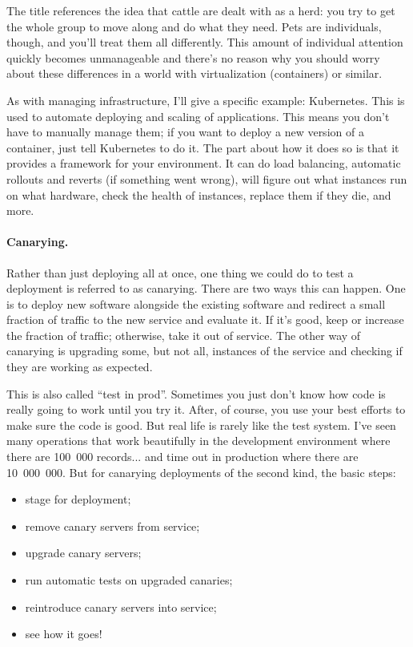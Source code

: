 \documentclass[a4paper]{report}
\begin{document}
The title references the idea that cattle are dealt with as a herd: you try to get the whole group to move along and do what they need. Pets are individuals, though, and you'll treat them all differently. This amount of individual attention quickly becomes unmanageable and there's no reason why you should worry about these differences in a world with virtualization (containers) or similar. 

As with managing infrastructure, I'll give a specific example: Kubernetes. This is used to automate deploying and scaling of applications. This means you don't have to manually manage them; if you want to deploy a new version of a container, just tell Kubernetes to do it. The part about how it does so is that it provides a framework for your environment. It can do load balancing, automatic rollouts and reverts (if something went wrong), will figure out what instances run on what hardware, check the health of instances, replace them if they die, and more.

\paragraph{Canarying.} Rather than just deploying all at once, one thing we could do to test a deployment is referred to as canarying. There are two ways this can happen. One is to deploy new software alongside the existing software and redirect a small fraction of traffic  to the new service and evaluate it. If it's good, keep or increase the fraction of traffic; otherwise, take it out of service. The other way of canarying is upgrading some, but not all, instances of the service and checking if they are working as expected.

This is also called ``test in prod''. Sometimes you just don't know how code is really going to work until you try it. After, of course, you use your best
efforts to make sure the code is good. But real life is rarely like the test system. I've seen many operations that work beautifully in the development environment where there are 100~000 records... and time out in production where there are 10~000~000. But for canarying deployments of the second kind, the basic steps:
\begin{itemize}
\item stage for deployment;
\item remove canary servers from service;
\item upgrade canary servers;
\item run automatic tests on upgraded canaries;
\item reintroduce canary servers into service;
\item see how it goes!
\end{itemize}
\end{document}
